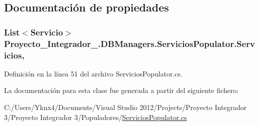 \subsection{Documentación de propiedades}
\hypertarget{class_proyecto___integrador__3_1_1_d_b_managers_1_1_servicios_populator_a5c0044cf4a9e52ee30c25cfcb8112876}{
\subsubsection[{Servicios}]{\setlength{\rightskip}{0pt plus 5cm}List$<${\bf Servicio}$>$ Proyecto\-\_\-\-Integrador\-\_.\-D\-B\-Managers.\-Servicios\-Populator.\-Servicios\hspace{0.3cm}{\ttfamily [get]}, {\ttfamily [set]}}}\label{class_proyecto___integrador__3_1_1_d_b_managers_1_1_servicios_populator_a5c0044cf4a9e52ee30c25cfcb8112876}


Definición en la línea 51 del archivo Servicios\-Populator.\-cs.



La documentación para esta clase fue generada a partir del siguiente fichero\-:\begin{DoxyCompactItemize}
\item 
C\-:/\-Users/\-Yknx4/\-Documents/\-Visual Studio 2012/\-Projects/\-Proyecto Integrador 3/\-Proyecto Integrador 3/\-Populadores/\hyperlink{_servicios_populator_8cs}{Servicios\-Populator.\-cs}\end{DoxyCompactItemize}
